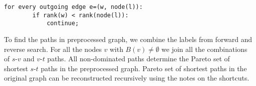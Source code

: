 
\begin{lstlisting}[caption={Reverse Search},label=list:8-6,captionpos=t,float,abovecaptionskip=-\medskipamount]
    for every outgoing edge e=(w, node(l)):
    	if rank(w) < rank(node(l)):
        	continue;
\end{lstlisting}

To find the paths in preprocessed graph, we combine the labels from forward and reverse search. 
For all the nodes $v$ with $B(v) \ne \emptyset$ we join all the combinations of $s$-$v$ and $v$-$t$ paths. All non-dominated paths determine the Pareto set of shortest $s$-$t$ paths in the preprocessed graph.
Pareto set of shortest paths in the original graph can be reconstructed recursively using the notes on the shortcuts.

